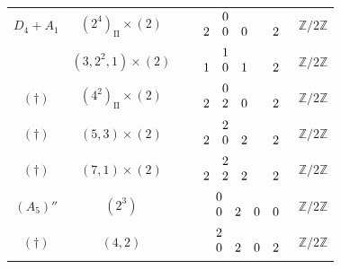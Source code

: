\documentclass[11pt]{amsart}
\newcommand{\bZ}{{\mathbb Z}}
\newcommand{\II}{{\operatorname{II}}}
\numberwithin{equation}{section}
\begin{document}
\begin{center}
\begin{longtable}{|c|c|c|c|}
			$D_4+A_1$ & $(2^4)_\II\times (2)$ & $\renewcommand{\arraystretch}{}\begin{array}{c c c c c c}
				&  & 0 & & & \\
				& 2 & 0 & 0 &  & 2   \\
			\end{array}$ & $\bZ/2\bZ$\\
			& $(3,2^2,1)\times (2)$ & $\renewcommand{\arraystretch}{}\begin{array}{c c c c c c}
				&  & 1 & & & \\
				& 1 & 0 & 1 &  & 2   \\
			\end{array}$ & $\bZ/2\bZ$\\
			$(\dagger)$ & $(4^2)_\II\times (2)$ & $\renewcommand{\arraystretch}{}\begin{array}{c c c c c c}
				&  & 0 & & & \\
				& 2 & 2 & 0 &  & 2   \\
			\end{array}$ & $\bZ/2\bZ$\\
			$(\dagger)$ & $(5,3)\times (2)$ & $\renewcommand{\arraystretch}{}\begin{array}{c c c c c c}
				&  & 2 & & & \\
				& 2 & 0 & 2 &  & 2   \\
			\end{array}$ & $\bZ/2\bZ$\\
			$(\dagger)$ & $(7,1)\times (2)$ & $\renewcommand{\arraystretch}{}\begin{array}{c c c c c c}
				&  & 2 & & & \\
				& 2 & 2 & 2 &  & 2   \\
			\end{array}$ & $\bZ/2\bZ$\\
			\hline
			$(A_5)''$ & $(2^3)$ & $\renewcommand{\arraystretch}{}\begin{array}{c c c c c c}
				&  & 0 & & & \\
				&  & 0 & 2 & 0 & 0   \\
			\end{array}$ & $\bZ/2\bZ$\\
			$(\dagger)$ & $(4,2)$ & $\renewcommand{\arraystretch}{}\begin{array}{c c c c c c}
				&  & 2 & & & \\
				&  & 0 & 2 & 0 & 2   \\
			\end{array}$ & $\bZ/2\bZ$\\

\end{longtable}
\end{center}
\end{document}
